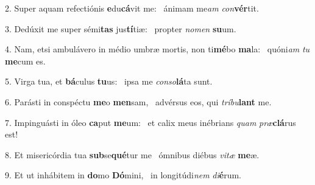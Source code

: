2. Super aquam refectiónis \textbf{e}du\textbf{cá}vit me: \ast\  ánimam me\textit{am} \textit{con}\textbf{vér}tit.\

3. Dedúxit me super sémi\textbf{tas} jus\textbf{tí}tiæ: \ast\  propter \textit{no}\textit{men} \textbf{su}um.\

4. Nam, etsi ambulávero in médio umbræ mortis, non ti\textbf{mé}bo \textbf{ma}la: \ast\  quóni\textit{am} \textit{tu} \textbf{me}cum es.\

5. Virga tua, et \textbf{bá}culus \textbf{tu}us: \ast\  ipsa me \textit{con}\textit{so}\textbf{lá}ta sunt.\

6. Parásti in conspéctu \textbf{me}o \textbf{men}sam, \ast\  advérsus eos, qui \textit{trí}\textit{bu}\textbf{lant} me.\

7. Impinguásti in óleo \textbf{ca}put \textbf{me}um: \ast\  et calix meus inébrians \textit{quam} \textit{præ}\textbf{clá}rus est!\

8. Et misericórdia tua \textbf{sub}se\textbf{qué}tur me \ast\  ómnibus diébus \textit{vi}\textit{tæ} \textbf{me}æ.\

9. Et ut inhábitem in \textbf{do}mo \textbf{Dó}mini, \ast\  in longitúdi\textit{nem} \textit{di}\textbf{é}rum.\

